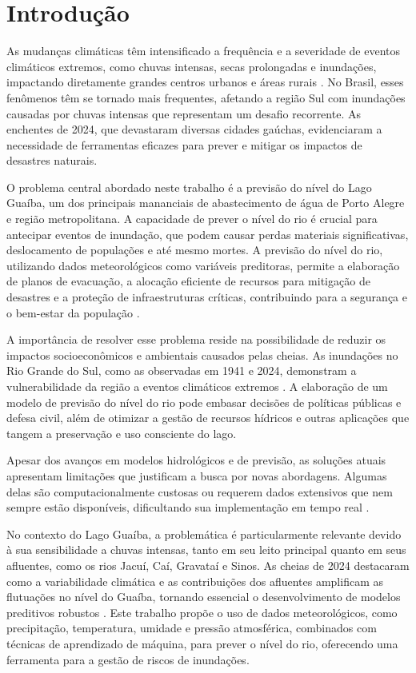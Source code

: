 \chapter{Introdução}
As mudanças climáticas têm intensificado a frequência e a severidade de eventos climáticos extremos, como chuvas intensas, secas prolongadas e inundações, impactando diretamente grandes centros urbanos e áreas rurais \cite{veja2024}. No Brasil, esses fenômenos têm se tornado mais frequentes, afetando a região Sul com inundações causadas por chuvas intensas que representam um desafio recorrente. As enchentes de 2024, que devastaram diversas cidades gaúchas, evidenciaram a necessidade de ferramentas eficazes para prever e mitigar os impactos de desastres naturais.

O problema central abordado neste trabalho é a previsão do nível do Lago Guaíba, um dos principais mananciais de abastecimento de água de Porto Alegre e região metropolitana. A capacidade de prever o nível do rio é crucial para antecipar eventos de inundação, que podem causar perdas materiais significativas, deslocamento de populações e até mesmo mortes. A previsão do nível do rio, utilizando dados meteorológicos como variáveis preditoras, permite a elaboração de planos de evacuação, a alocação eficiente de recursos para mitigação de desastres e a proteção de infraestruturas críticas, contribuindo para a segurança e o bem-estar da população \cite{andrade2017}.

A importância de resolver esse problema reside na possibilidade de reduzir os impactos socioeconômicos e ambientais causados pelas cheias. As inundações no Rio Grande do Sul, como as observadas em 1941 e 2024, demonstram a vulnerabilidade da região a eventos climáticos extremos \cite{veja2024}. A elaboração de um modelo de previsão do nível do rio pode embasar decisões de políticas públicas e defesa civil, além de otimizar a gestão de recursos hídricos e outras aplicações que tangem a preservação e uso consciente do lago.

Apesar dos avanços em modelos hidrológicos e de previsão, as soluções atuais apresentam limitações que justificam a busca por novas abordagens. Algumas delas são computacionalmente custosas ou requerem dados extensivos que nem sempre estão disponíveis, dificultando sua implementação em tempo real \cite{andrade2017}.

No contexto do Lago Guaíba, a problemática é particularmente relevante devido à sua sensibilidade a chuvas intensas, tanto em seu leito principal quanto em seus afluentes, como os rios Jacuí, Caí, Gravataí e Sinos. As cheias de 2024 destacaram como a variabilidade climática e as contribuições dos afluentes amplificam as flutuações no nível do Guaíba, tornando essencial o desenvolvimento de modelos preditivos robustos \cite{veja2024}. Este trabalho propõe o uso de dados meteorológicos, como precipitação, temperatura, umidade e pressão atmosférica, combinados com técnicas de aprendizado de máquina, para prever o nível do rio, oferecendo uma ferramenta para a gestão de riscos de inundações.

